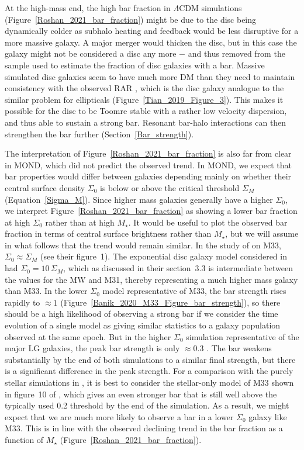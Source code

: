 \documentclass[fleqn,usenatbib,useAMS]{mnras} %
\begin{document}
At the high-mass end, the high bar fraction in $\Lambda$CDM simulations (Figure~\ref{Roshan_2021_bar_fraction}) might be due to the disc being dynamically colder as subhalo heating and feedback would be less disruptive for a more massive galaxy. A major merger would thicken the disc, but in this case the galaxy might not be considered a disc any more $-$ and thus removed from the sample used to estimate the fraction of disc galaxies with a bar. Massive simulated disc galaxies seem to have much more DM than they need to maintain consistency with the observed RAR \citep{Marasco_2020}, which is the disc galaxy analogue to the similar problem for ellipticals (Figure~\ref{Tian_2019_Figure_3}). This makes it possible for the disc to be Toomre stable with a rather low velocity dispersion, and thus able to sustain a strong bar. Resonant bar-halo interactions can then strengthen the bar further (Section~\ref{Bar_strength}).

The interpretation of Figure~\ref{Roshan_2021_bar_fraction} is also far from clear in MOND, which did not predict the observed trend. In MOND, we expect that bar properties would differ between galaxies depending mainly on whether their central surface density $\Sigma_0$ is below or above the critical threshold $\Sigma_M$ (Equation~\ref{Sigma_M}). Since higher mass galaxies generally have a higher $\Sigma_0$, we interpret Figure~\ref{Roshan_2021_bar_fraction} as showing a lower bar fraction at high $\Sigma_0$ rather than at high $M_{\star}$. It would be useful to plot the observed bar fraction in terms of central surface brightness rather than $M_{\star}$, but we will assume in what follows that the trend would remain similar. In the study of \citet{Banik_2020_M33} on M33, $\Sigma_0 \approx \Sigma_M$ (see their figure~1). The exponential disc galaxy model considered in \citet{Roshan_2021_disc_stability} had $\Sigma_0 = 10 \, \Sigma_M$, which as discussed in their section~3.3 is intermediate between the values for the MW and M31, thereby representing a much higher mass galaxy than M33. In the lower $\Sigma_0$ model representative of M33, the bar strength rises rapidly to $\approx 1$ (Figure~\ref{Banik_2020_M33_Figure_bar_strength}), so there should be a high likelihood of observing a strong bar if we consider the time evolution of a single model as giving similar statistics to a galaxy population observed at the same epoch. But in the higher $\Sigma_0$ simulation representative of the major LG galaxies, the peak bar strength is only $\approx 0.3$ \citep[see figure~13 of][]{Roshan_2021_disc_stability}. The bar weakens substantially by the end of both simulations to a similar final strength, but there is a significant difference in the peak strength. For a comparison with the purely stellar simulations in \citet{Roshan_2021_disc_stability}, it is best to consider the stellar-only model of M33 shown in figure~10 of \citet{Banik_2020_M33}, which gives an even stronger bar that is still well above the typically used 0.2 threshold by the end of the simulation. As a result, we might expect that we are much more likely to observe a bar in a lower $\Sigma_0$ galaxy like M33. This is in line with the observed declining trend in the bar fraction as a function of $M_{\star}$ (Figure~\ref{Roshan_2021_bar_fraction}).
\end{document}
